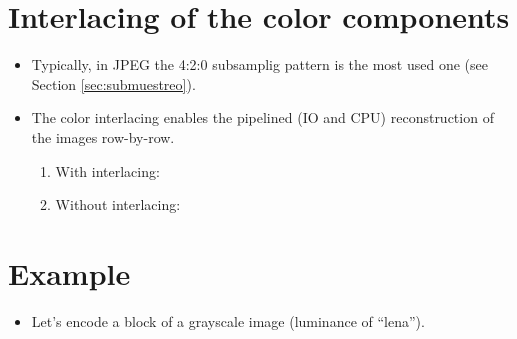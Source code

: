 \section{Interlacing of the color components}
\begin{itemize}
\item Typically, in JPEG the 4:2:0 subsamplig pattern is the most used
  one (see Section \ref{sec:submuestreo}).
\item The color interlacing enables the pipelined (IO and CPU)
  reconstruction of the images row-by-row.
  \begin{enumerate}
  \item With interlacing:
    \begin{center}
    \end{center}
  \item Without interlacing:
    \begin{center}
    \end{center}
  \end{enumerate}
\end{itemize}

\section*{Example}
\begin{itemize}
\item Let's encode a block of a grayscale image (luminance of
  ``lena'').
  \begin{center}
  \end{center}
\end{itemize}

